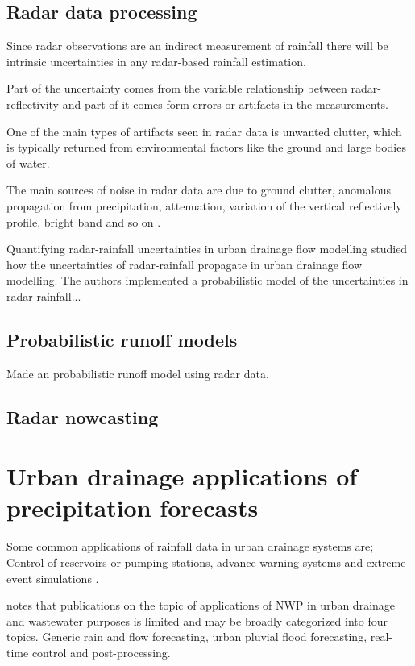 \subsection{Radar data processing}
Since radar observations are an indirect measurement of rainfall there will be intrinsic uncertainties in any radar-based rainfall estimation. 

Part of the uncertainty comes from the variable relationship between radar-reflectivity and part of it comes form errors or artifacts in the measurements. 

One of the main types of artifacts seen in radar data is unwanted clutter, which is typically returned from environmental factors like the ground and large bodies of water. 


The main sources of noise in radar data are due to ground clutter, anomalous propagation from precipitation, attenuation, variation of the vertical reflectively profile, bright band and so on \cite{RICORAMIREZ201517}.


Quantifying radar-rainfall uncertainties in urban drainage flow modelling
\cite{RICORAMIREZ201517} studied how the uncertainties of radar-rainfall propagate in urban drainage flow modelling. The authors implemented a probabilistic model of the uncertainties in radar rainfall...


\cite{KRAJEWSKI20021387} 


\subsection{Probabilistic runoff models}
\cite{LOWE2014397} Made an probabilistic runoff model using radar data. 

\subsection{Radar nowcasting}
 

\section{Urban drainage applications of precipitation forecasts}
Some common applications of rainfall data in urban drainage systems  are; Control of reservoirs or pumping stations, advance warning systems and extreme event simulations \cite{RN301}. 

\cite{jonasphd} notes that publications on the topic of applications of NWP in urban drainage and wastewater purposes is limited and may be broadly categorized into four topics. Generic rain and flow forecasting, urban pluvial flood forecasting, real-time control and post-processing. 




